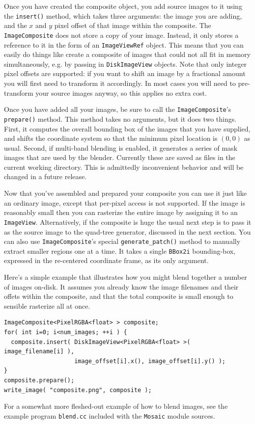 Once you have created the composite object, you add source images to
it using the \verb#insert()# method, which takes three arguments: the
image you are adding, and the $x$ and $y$ pixel offset of that image
within the composite.  The \verb#ImageComposite# does not store a copy
of your image.  Instead, it only stores a reference to it in the form
of an \verb#ImageViewRef# object.  This means that you can easily do
things like create a composite of images that could not all fit in
memory simultaneously, e.g. by passing in \verb#DiskImageView#
objects.  Note that only integer pixel offsets are supported: if you
want to shift an image by a fractional amount you will first need to
transform it accordingly.  In most cases you will need to
pre-transform your source images anyway, so this applies no extra
cost.

Once you have added all your images, be sure to call the 
\verb#ImageComposite#'s \verb#prepare()# method.  This method takes 
no arguments, but it does two things.  First, it computes the 
overall bounding box of the images that you have supplied, and 
shifts the coordinate system so that the minimum pixel location 
is $(0,0)$ as usual.  Second, if multi-band blending is enabled, 
it generates a series of mask images that are used by the blender. 
Currently these are saved as files in the current working directory. 
This is admittedly inconvenient behavior and will be changed in a 
future release.

Now that you've assembled and prepared your composite you can use 
it just like an ordinary image, except that per-pixel access is 
not supported.  If the image is reasonably small then you can 
rasterize the entire image by assigning it to an \verb#ImageView#. 
Alternatively, if the composite is huge the usual next step is to 
pass it as the source image to the quad-tree generator, discussed 
in the next section.  You can also use \verb#ImageComposite#'s 
special \verb#generate_patch()# method to manually extract smaller 
regions one at a time.  It takes a single \verb#BBox2i# bounding-box, 
expressed in the re-centered coordinate frame, as its only argument.

Here's a simple example that illustrates how you might blend 
together a number of images on-disk.  It assumes you already know 
the image filenames and their offets within the composite, and 
that the total composite is small enough to sensible rasterize all 
at once.
\begin{verbatim}
ImageComposite<PixelRGBA<float> > composite;
for( int i=0; i<num_images; ++i ) {
  composite.insert( DiskImageView<PixelRGBA<float> >( image_filename[i] ),
                    image_offset[i].x(), image_offset[i].y() );
}
composite.prepare();
write_image( "composite.png", composite );
\end{verbatim}
For a somewhat more fleshed-out example of how to blend images, 
see the example program \verb#blend.cc# included with the 
\verb#Mosaic# module sources.

